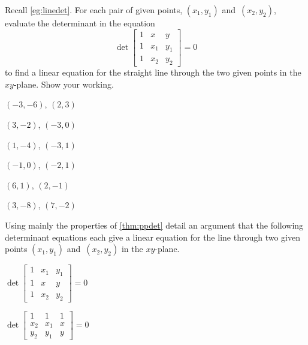 \begin{exercise}  
Recall \cref{eg:linedet}.
For each pair of given points, \((x_1,y_1)\) and~\((x_2,y_2)\), evaluate the determinant in the equation
\begin{equation*}
\det\begin{bmatrix} 1 &x&y\\1&x_1&y_1\\1&x_2&y_2 \end{bmatrix}=0
\end{equation*}
to find a linear equation for the straight line through the two given points in the \(xy\)-plane.
Show your working.
\begin{Parts}
\item \((-3,-6)\), \((2,3)\)

\item \((3,-2)\), \((-3,0)\)

\item \((1,-4)\), \((-3,1)\)

\item \((-1,0)\), \((-2,1)\)

\begin{OmitV1}
\item \((6,1)\), \((2,-1)\)

\item \((3,-8)\), \((7,-2)\)
\end{OmitV1}
\end{Parts}
\end{exercise}




\begin{exercise}  
Using mainly the properties of \cref{thm:ppdet} detail an argument that the following determinant equations each give a linear equation for the line through two given points \((x_1,y_1)\) and~\((x_2,y_2)\) in the \(xy\)-plane.
\begin{Parts}
\item \(\det\begin{bmatrix} 1&x_1&y_1
\\1&x&y
\\1&x_2&y_2 \end{bmatrix}=0\)

\item \(\det\begin{bmatrix} 1&1&1
\\x_2&x_1&x
\\y_2&y_1&y \end{bmatrix}=0\)

\end{Parts}
\end{exercise}





